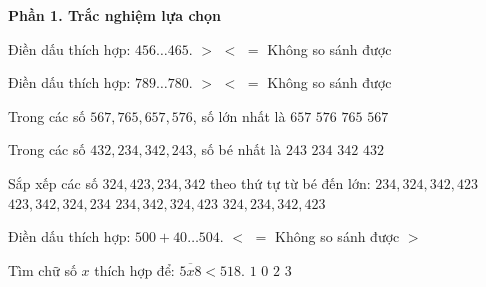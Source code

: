 \textbf{Phần 1. Trắc nghiệm lựa chọn}

\begin{ex} %
Điền dấu thích hợp: $456 \dots 465$.
\choice
{$>$}
{\True $<$}
{$=$}
{Không so sánh được}
\end{ex}

\begin{ex} %
Điền dấu thích hợp: $789 \dots 780$.
\choice
{\True $>$}
{$<$}
{$=$}
{Không so sánh được}
\end{ex}

\begin{ex} %
Trong các số $567, 765, 657, 576$, số lớn nhất là
\choice
{$657$}
{$576$}
{\True $765$}
{$567$}
\end{ex}

\begin{ex} %
Trong các số $432, 234, 342, 243$, số bé nhất là
\choice
{$243$}
{\True $234$}
{$342$}
{$432$}
\end{ex}

\begin{ex} %
Sắp xếp các số $324, 423, 234, 342$ theo thứ tự từ bé đến lớn:
\choice
{\True $234, 324, 342, 423$}
{$423, 342, 324, 234$}
{$234, 342, 324, 423$}
{$324, 234, 342, 423$}
\end{ex}

\begin{ex} %
Điền dấu thích hợp: $500 + 40 \dots 504$.
\choice
{$<$}
{$=$}
{Không so sánh được}
{\True $>$}
\end{ex}

\begin{ex} %
Tìm chữ số $x$ thích hợp để: $\overline{5x8} < 518$.
\choice
{$1$}
{\True $0$}
{$2$}
{$3$}
\end{ex}

